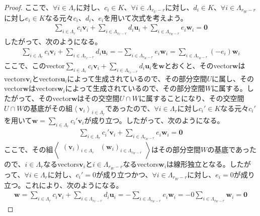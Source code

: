 \documentclass[dvipdfmx]{jsarticle}
\begin{document}
\begin{proof}
ここで、$\forall i \in \varLambda_{r}$に対し、$c_{i} \in K$、$\forall i \in \varLambda_{r_{U} - r}$に対し、$d_{i} \in K$、$\forall i \in \varLambda_{r_{W} - r}$に対し$e_{i} \in K$なる元々$c_{i}$、$d_{i}$、$e_{i}$を用いて次式を考えよう。
\begin{align*}
\sum_{i \in \varLambda_{r}} {c_{i}\mathbf{v}_{i}} + \sum_{i \in \varLambda_{r_{U} - r}} {d_{i}\mathbf{u}_{i}} + \sum_{i \in \varLambda_{r_{W} - r}} {e_{i}\mathbf{w}_{i}} = \mathbf{0}
\end{align*}
したがって、次のようになる。
\begin{align*}
\sum_{i \in \varLambda_{r}} {c_{i}\mathbf{v}_{i}} + \sum_{i \in \varLambda_{r_{U} - r}} {d_{i}\mathbf{u}_{i}} = - \sum_{i \in \varLambda_{r_{W} - r}} {e_{i}\mathbf{w}_{i}} = \sum_{i \in \varLambda_{r_{W} - r}} {\left( - e_{i} \right)\mathbf{w}_{i}}
\end{align*}
ここで、このvector$\sum_{i \in \varLambda_{r}} {c_{i}\mathbf{v}_{i}} + \sum_{i \in \varLambda_{r_{U} - r}} {d_{i}\mathbf{u}_{i}}$を$\mathbf{w}$とおくと、そのvector$\mathbf{w}$はvectors$\mathbf{v}_{i}$とvectors$\mathbf{u}_{i}$によって生成されているので、その部分空間$U$に属し、そのvector$\mathbf{w}$はvectors$\mathbf{w}_{i}$によって生成されているので、その部分空間$W$に属する。したがって、そのvector$\mathbf{w}$はその交空間$U \cap W$に属することになり、その交空間$U \cap W$の基底がその組$\left\langle \mathbf{v}_{i} \right\rangle_{i \in \varLambda_{r}}$であったので、$\forall i \in \varLambda_{r}$に対し$c_{i}' \in K$なる元々$c_{i}'$を用いて$\mathbf{w} = \sum_{i \in \varLambda_{r}} {c_{i}'\mathbf{v}_{i}}$が成り立つ。したがって、次のようになる。
\begin{align*}
\sum_{i \in \varLambda_{r}} {c_{i}'\mathbf{v}_{i}} + \sum_{i \in \varLambda_{r_{W} - r}} {e_{i}\mathbf{w}_{i}} = \mathbf{0}
\end{align*}
ここで、その組$\left\langle \begin{matrix}
\left( \mathbf{v}_{i} \right)_{i \in \varLambda_{r}} & \left( \mathbf{w}_{i} \right)_{i \in \varLambda_{r_{W} - r}} \\
\end{matrix} \right\rangle$はその部分空間$W$の基底であったので、$i \in \varLambda_{r}$なるvectors$\mathbf{v}_{i}$と$i \in \varLambda_{r_{W} - r}$なるvectors$\mathbf{w}_{i}$は線形独立となる。したがって、$\forall i \in \varLambda_{r}$に対し、$c_{i}' = 0$が成り立つかつ、$\forall i \in \varLambda_{r_{W} - r}$に対し、$e_{i} = 0$が成り立つ。これにより、次のようになる。
\begin{align*}
\mathbf{w} = \sum_{i \in \varLambda_{r}} {c_{i}\mathbf{v}_{i}} + \sum_{i \in \varLambda_{r_{U} - r}} {d_{i}\mathbf{u}_{i}} = - \sum_{i \in \varLambda_{r_{W} - r}} {e_{i}\mathbf{w}_{i}} = - 0\sum_{i \in \varLambda_{r_{W} - r}} \mathbf{w}_{i} = \mathbf{0}

\end{align*}
\end{proof}
\end{document}

